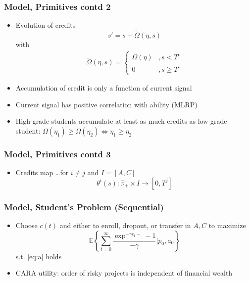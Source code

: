 \begin{frame}
	\frametitle{Model, Primitives contd 2}
		\begin{itemize}
			\item Evolution of credits
				\begin{equation}
					s' = s + \tilde{\Omega} (\eta, s)
				\end{equation}
\noindent with
				\begin{eqnarray}
					 \tilde{\Omega} (\eta, s) = 
					 	\begin{cases}
					 		\Omega(\eta) &, s < T^i \\
					 		0 &, s \geq T^i
					 	\end{cases}
				\end{eqnarray}
			\item Accumulation of credit is only a function of current signal
			\item Current signal has positive correlation with ability (MLRP)
			\item High-grade students accumulate at least as much credits as low-grade student: $\Omega(\eta_{1}) \geq \Omega(\eta_{2}) \Leftrightarrow \eta_{1} \geq \eta_{2}$
		\end{itemize}		 
\end{frame}

\begin{frame}
	\frametitle{Model, Primitives contd 3}
		\begin{itemize}
			\item Credits map \ldots for $i \neq j$ and $I = [A,C]$
				\begin{equation}
					\theta^i (s): \mathbb{R}_{+} \times I \rightarrow [0,T^j]
				\end{equation}
		\end{itemize}
\end{frame}

\begin{frame}
	\frametitle{Model, Student's Problem (Sequential)}
		\begin{itemize}
			\item Choose $c(t)$ and either to enroll, dropout, or transfer in $A,C$ to maximize
		\begin{equation}
			\mathbb{E} \left\{ \sum \limits _{t=0} ^{\infty}  \frac{\exp ^{- \gamma c_{t} -} - 1}{- \gamma} | p_{0}, a_{0}  \right\}
		\end{equation}
\noindent s.t. \eqref{eq:a} holds
		\item CARA utility: order of risky projects is independent of financial wealth
		\end{itemize}
\end{frame}

